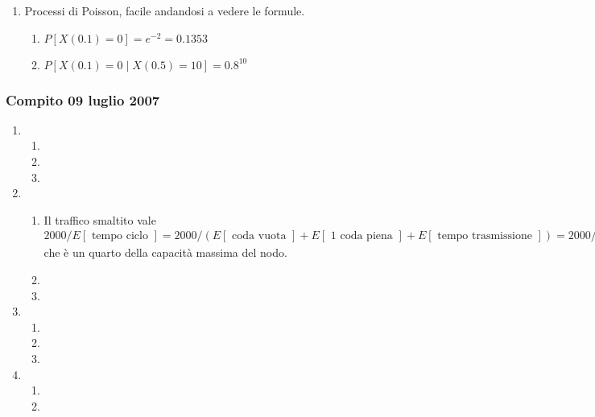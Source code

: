 \documentclass{article}
\begin{document}
\begin{enumerate}
\begin{enumerate}[label=\alph*)]
        \item\begin{align*}
        T = \left[\begin{array}{c c c}
        -&T&-\\\beta T&-&\frac{\beta T}{2}\\\gamma T&-&-\\
        \end{array}\right]
        \end{align*}
    \end{enumerate}

    \item Processi di Poisson, facile andandosi a vedere le formule.
    \begin{enumerate}[label=\alph*)]
        \item $P[X(0.1) = 0] = e^{-2} = 0.1353$
        \item $P[X(0.1) = 0\mid X(0.5) = 10] = 0.8^{10}$
    \end{enumerate}
\end{enumerate}

\newpage
\subsubsection{Compito 09 luglio 2007}
\begin{enumerate}
    \item\begin{enumerate}[label=\alph*)]
        \item
        \item
        \item
    \end{enumerate}
    
    \item\begin{enumerate}[label=\alph*)]
        \item Il traffico smaltito vale $2000 / E[\text{ tempo ciclo }] = 2000/(E[\text{ coda vuota }] + E[\text{ 1 coda piena }] + E[\text{ tempo trasmissione }]) = 2000 / (\frac{1}{2\lambda} + \frac{1}{\lambda} + 10^{-3}) = 0.5 \text{ Mbps}$ che è un quarto della capacità massima del nodo.
        \item
        \item
    \end{enumerate}
    
    \item\begin{enumerate}[label=\alph*)]
        \item
        \item
        \item
    \end{enumerate}
    
    \item\begin{enumerate}[label=\alph*)]
        \item
        \item
    \end{enumerate}
\end{enumerate}
\end{document}
